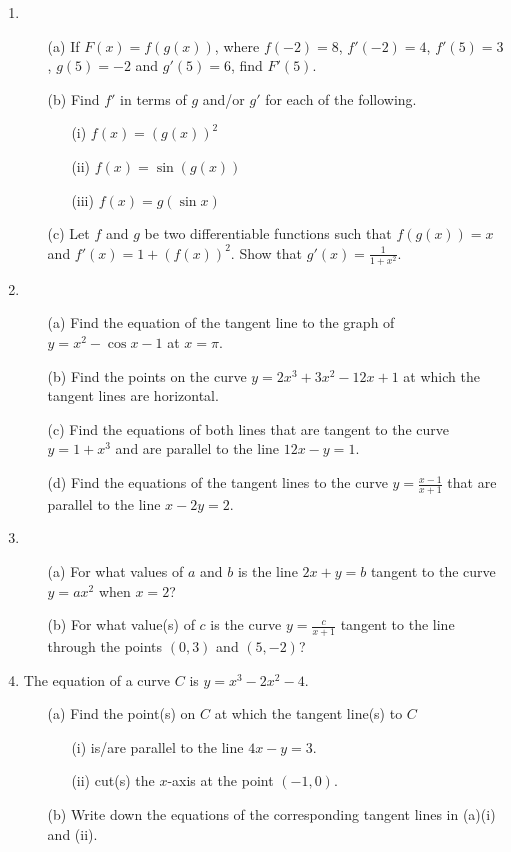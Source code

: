 \documentclass[12pt]{article}
\newcommand{\ds}{\displaystyle}
\begin{document}
\begin{enumerate}
\item
\begin{enumerate}
\item[(a)]
If $F(x)=f\left(g(x)\right)$, where $f(-2)=8$, $f'(-2)=4$, $f'(5)=3$, $g(5)=-2$ and $g'(5)=6$, find $F'(5)$.
\item[(b)]
Find $f'$ in terms of $g$ and/or $g'$ for each of the following.
\begin{enumerate}
\item[(i)]
$\ds f(x)=\left(g(x)\right)^2$
\item[(ii)]
$\ds f(x) = \sin\left(g(x)\right)$
\item[(iii)]
$\ds f(x) = g(\sin x)$
\end{enumerate}
\item[(c)]
Let $f$ and $g$ be two differentiable functions such that $f\left(g(x)\right)=x$ and $f'(x) = 1 + \left(f(x)\right)^2$. Show that $\ds g'(x)=\frac{1}{1+x^2}$.
\end{enumerate}

\item
\begin{enumerate}
\item[(a)]
Find the equation of the tangent line to the graph of $y = x^2 - \cos x - 1$ at $x = \pi$.
\item[(b)]
Find the points on the curve $y=2x^3+3x^2-12x+1$ at which the tangent lines are horizontal.
\item[(c)]
Find the equations of both lines that are tangent to the curve $y=1+x^3$ and are parallel to the line $12x-y=1$.
\item[(d)]
Find the equations of the tangent lines to the curve $\ds y = \frac{x-1}{x+1}$ that are parallel to the line $x-2y=2$.
\end{enumerate}

\item
\begin{enumerate}
\item[(a)]
For what values of $a$ and $b$ is the line $2x+y=b$ tangent to the curve $y = ax^2$ when $x=2$?
\item[(b)]
For what value(s) of $c$ is the curve $\ds y = \frac{c}{x+1}$ tangent to the line through the points $(0, 3)$ and $(5, -2)$?
\end{enumerate}

\item
The equation of a curve $C$ is $y = x^3 - 2x^2 - 4$.
\begin{enumerate}
\item[(a)]
Find the point(s) on $C$ at which the tangent line(s) to $C$
\begin{enumerate}
\item[(i)]
is/are parallel to the line $4x - y = 3$.
\item[(ii)]
cut(s) the $x$-axis at the point $(-1, 0)$. 
\end{enumerate}
\item[(b)]
Write down the equations of the corresponding tangent lines in (a)(i) and (ii).
\end{enumerate} 


\end{enumerate}
\end{document}
